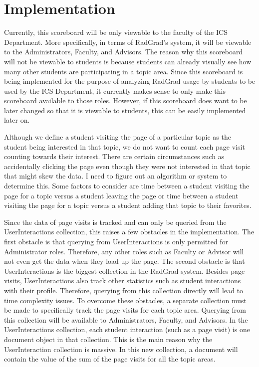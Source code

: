 \documentclass[english]{proposalnsf}
\begin{document}
  \section{Implementation}
  \label{sec:implementation}
  Currently, this scoreboard will be only viewable to the faculty of the ICS Department. More specifically, in terms of RadGrad's system, it will be viewable to the Administrators, Faculty, and Advisors. The reason why this scoreboard will not be viewable to students is because students can already visually see how many other students are participating in a topic area. Since this scoreboard is being implemented for the purpose of analyzing RadGrad usage by students to be used by the ICS Department, it currently makes sense to only make this scoreboard available to those roles. However, if this scoreboard does want to be later changed so that it is viewable to students, this can be easily implemented later on.

  Although we define a student visiting the page of a particular topic as the student being interested in that topic, we do not want to count each page visit counting towards their interest. There are certain circumstances such as accidentally clicking the page even though they were not interested in that topic that might skew the data. I need to figure out an algorithm or system to determine this. Some factors to consider are time between a student visiting the page for a topic versus a student leaving the page or time between a student visiting the page for a topic versus a student adding that topic to their favorites.

  Since the data of page visits is tracked and can only be queried from the UserInteractions collection, this raises a few obstacles in the implementation. The first obstacle is that querying from UserInteractions is only permitted for Administrator roles. Therefore, any other roles such as Faculty or Advisor will not even get the data when they load up the page. The second obstacle is that UserInteractions is the biggest collection in the RadGrad system. Besides page visits, UserInteractions also track other statistics such as student interactions with their profile. Therefore, querying from this collection directly will lead to time complexity issues. To overcome these obstacles, a separate collection must be made to specifically track the page visits for each topic area. Querying from this collection will be available to Administrators, Faculty, and Advisors. In the UserInteractions collection, each student interaction (such as a page visit) is one document object in that collection. This is the main reason why the UserInteraction collection is massive. In this new collection, a document will contain the value of the sum of the page visits for all the topic areas.
\end{document}
